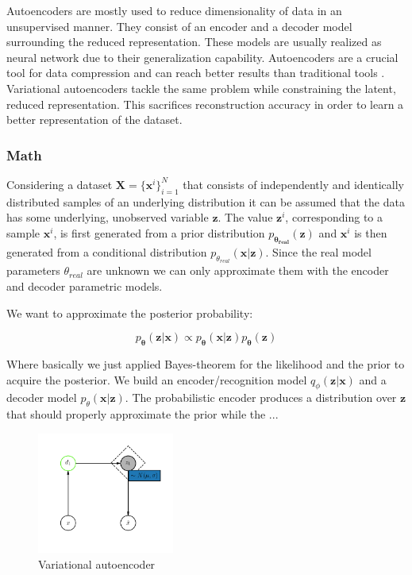 \documentclass[11pt, english]{article}
\begin{document}
\par Autoencoders are mostly used to reduce dimensionality of data in an unsupervised manner. They consist of an encoder and a decoder model surrounding the reduced representation. These models are usually realized as neural network due to their generalization capability. Autoencoders are a crucial tool for data compression and can reach better results than traditional tools \cite{theis2017lossy}. Variational autoencoders tackle the same problem while constraining the latent, reduced representation. This sacrifices reconstruction accuracy in order to learn a better representation of the dataset.

\subsubsection{Math}

\par Considering a dataset $\boldsymbol{X} = \big\{\boldsymbol{x}^{i}\big\}_{i = 1}^{N}$ that consists of independently and identically distributed samples of an underlying distribution it can be assumed that the data has some underlying, unobserved variable $\boldsymbol{z}$. The value $\boldsymbol{z}^{i}$, corresponding to a sample $\boldsymbol{x}^{i}$, is first generated from a prior distribution $p_{\boldsymbol{\theta_{real}}}(\boldsymbol{z})$ and $\boldsymbol{x}^{i}$ is then generated from a conditional distribution $p_{\theta_{real}}(\boldsymbol{x} | \boldsymbol{z})$. Since the real model parameters $\theta_{real}$ are unknown we can only approximate them with the encoder and decoder parametric models.
\par We want to approximate the posterior probability:

\begin{equation}
    p_{\boldsymbol{\theta}}(\boldsymbol{z} | \boldsymbol{x}) \propto p_{\boldsymbol{\theta}}(\boldsymbol{x} | \boldsymbol{z}) p_{\boldsymbol{\theta}}(\boldsymbol{z})
\end{equation}

\par Where basically we just applied Bayes-theorem for the likelihood and the prior to acquire the posterior. We build an encoder/recognition model $q_{\phi}(\boldsymbol{z} | \boldsymbol{x})$ and a decoder model $p_{\theta}(\boldsymbol{x} | \boldsymbol{z})$. The probabilistic encoder produces a distribution over $\boldsymbol{z}$ that should properly approximate the prior while the  ...

\begin{figure}[H]
    \centering
    \includegraphics[width=0.4\textwidth]{vae.png}
    \caption{Variational autoencoder}
    \label{fig:vae}
\end{figure}
\end{document}
